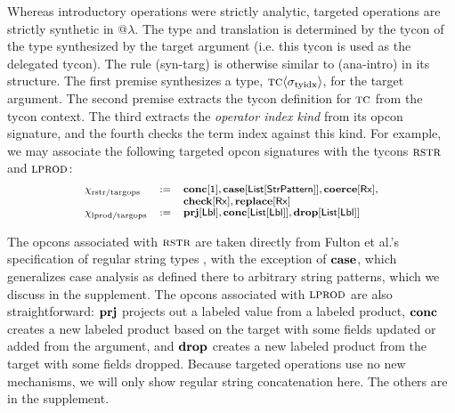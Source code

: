 \documentclass[10pt,preprint]{sigplanconf}
\begin{document}
Whereas introductory operations were strictly analytic, targeted operations are strictly synthetic in @$\lambda$. The type and translation is determined by the tycon of the type synthesized by the target argument (i.e. this tycon is used as the delegated tycon). The rule (syn-targ) is otherwise similar to (ana-intro) in its structure. The first premise synthesizes a type, ${\textsc{tc}}\langle\sigma_\text{tyidx}\rangle$, for the target argument. The second premise extracts the tycon definition for $\textsc{tc}$ from the tycon context. The third extracts the \emph{operator index kind} from its opcon signature, and the fourth checks the term index against this kind. For example, we may associate the following targeted opcon signatures with the tycons $\textsc{rstr}$ and $\textsc{lprod}$:\[\small
\begin{array}{lcl}
\chi_\text{rstr/targops} & := & \opsig{\opname{conc}}{\kunit}, \opsig{\opname{case}}{\klist{\keyw{StrPattern}}}, \opsig{\opname{coerce}}{\krx}, \\
& & \opsig{\opname{check}}{\krx}, \opsig{\opname{replace}}{\krx}\\
\chi_\text{lprod/targops} & := & \opsig{\opname{prj}}{\klbl}, \opsig{\opname{conc}}{\klist{\klbl}}, \opsig{\opname{drop}}{\klist{\klbl}}
\end{array}
\]

The opcons associated with $\textsc{rstr}$ are taken directly from Fulton et al.'s specification of regular string types \cite{sanitation-psp14}, with the exception of $\textbf{case}$, which generalizes case analysis as defined there to arbitrary string patterns, which we discuss in the supplement. The opcons associated with $\textsc{lprod}$ are also straightforward: $\textbf{prj}$ projects out a labeled value from a labeled product, $\textbf{conc}$ creates a new labeled product based on the target with some fields updated or added from the argument, and $\textbf{drop}$ creates a new labeled product from the target with some fields dropped. Because targeted operations use no new mechanisms, we will only show regular string concatenation here. The others are in the supplement.
\end{document}
